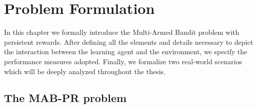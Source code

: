 \chapter{Problem Formulation}\label{CF}



In this chapter we formally introduce the Multi-Armed Bandit problem with persistent rewards. After defining all the elements and details necessary to depict the interaction between the learning agent and the environment, we specify the performance measures adopted. Finally, we formalize two real-world scenarios which will be deeply analyzed throughout the thesis.


\section{The MAB-PR problem}

